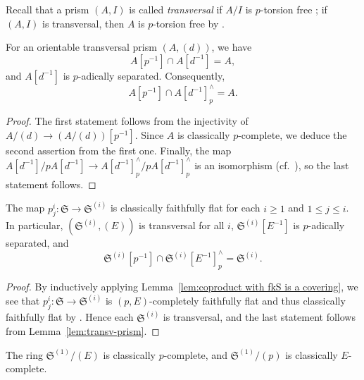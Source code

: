 Recall that a prism $(A, I)$ is called \emph{transversal} if $A/I$ is $p$-torsion free \cite[Def.~2.1.3]{Bhatt-Lurie-absoluteprismticcohomology}; if $(A, I)$ is transversal, then $A$ is $p$-torsion free by \cite[Rem.~2.1.7]{Bhatt-Lurie-absoluteprismticcohomology}.

\begin{lem} \label{lem:transv-prism}
For an orientable transversal prism $(A, (d))$, we have 
\[
A[p^{-1}] \cap A[d^{-1}] = A,
\]
and $A[d^{-1}]$ is $p$-adically separated. Consequently, 
\[
A[p^{-1}] \cap A[d^{-1}]^{\wedge}_p = A.
\]
\end{lem}


\begin{proof}
The first statement follows from the injectivity of $A/(d) \rightarrow (A/(d))[p^{-1}]$. Since $A$ is classically $p$-complete, we deduce the second assertion from the first one. Finally, the  map $A[d^{-1}]/pA[d^{-1}] \rightarrow A[d^{-1}]^{\wedge}_p/pA[d^{-1}]^{\wedge}_p$ is an isomorphism (cf.~\cite[Rem.~3.15(i)]{du-liu-moon-shimizu-completed-prismatic-F-crystal-loc-system}), so the last statement follows. 
\end{proof}

\begin{cor} \label{cor:proj-map-faithful-flat}
The map $p^i_j\colon \mathfrak{S} \rightarrow \mathfrak{S}^{(i)}$ is classically faithfully flat for each $i \geq 1$ and $1 \leq j \leq i$. In particular, $(\mathfrak{S}^{(i)},(E))$ is transversal for all $i$, $\mathfrak{S}^{(i)}[E^{-1}]$ is $p$-adically separated, and 
\[
\mathfrak{S}^{(i)}[p^{-1}] \cap \mathfrak{S}^{(i)}[E^{-1}]^{\wedge}_p = \mathfrak{S}^{(i)}.
\]
\end{cor}

\begin{proof}
By inductively applying Lemma~\ref{lem:coproduct with fkS is a covering}, we see that $p^i_j\colon \mathfrak{S} \rightarrow \mathfrak{S}^{(i)}$ is $(p,E)$-completely faithfully flat and thus classically faithfully flat by \cite[Tag~0912]{stacks-project}. Hence each $\mathfrak{S}^{(i)}$ is transversal, and the last statement follows from Lemma~\ref{lem:transv-prism}.
\end{proof}

\begin{lem} \label{lem:modE-modp-complete}
The ring $\mathfrak{S}^{(1)}/(E)$ is classically $p$-complete, and $\mathfrak{S}^{(1)}/(p)$ is classically $E$-complete.   
\end{lem}

